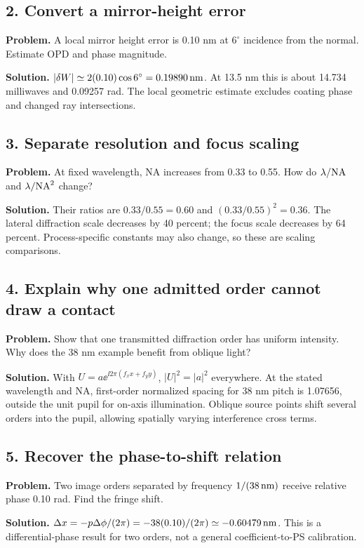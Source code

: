 \subsection*{2. Convert a mirror-height error}
\textbf{Problem.} A local mirror height error is 0.10 nm at $6^\circ$
incidence from the normal. Estimate OPD and phase magnitude.

\textbf{Solution.}
$|\delta W|\simeq2(0.10)\cos6^\circ=0.19890\,\mathrm{nm}$.
At 13.5 nm this is about 14.734 milliwaves and 0.09257 rad.
The local geometric estimate excludes coating phase and changed ray
intersections.

\subsection*{3. Separate resolution and focus scaling}
\textbf{Problem.} At fixed wavelength, NA increases from 0.33 to 0.55.
How do $\lambda/\mathrm{NA}$ and $\lambda/\mathrm{NA}^2$ change?

\textbf{Solution.}
Their ratios are $0.33/0.55=0.60$ and
$(0.33/0.55)^2=0.36$.
The lateral diffraction scale decreases by 40 percent; the focus
scale decreases by 64 percent. Process-specific constants may also
change, so these are scaling comparisons.

\subsection*{4. Explain why one admitted order cannot draw a contact}
\textbf{Problem.} Show that one transmitted diffraction order has uniform
intensity. Why does the 38 nm example benefit from oblique light?

\textbf{Solution.}
With $U=a\ee^{\ii2\pi(f_xx+f_yy)}$, $|U|^2=|a|^2$ everywhere.
At the stated wavelength and NA, first-order normalized spacing for
38 nm pitch is 1.07656, outside the unit pupil for on-axis illumination.
Oblique source points shift several orders into the pupil, allowing
spatially varying interference cross terms.

\subsection*{5. Recover the phase-to-shift relation}
\textbf{Problem.} Two image orders separated by frequency $1/(38\,\mathrm{nm})$
receive relative phase 0.10 rad. Find the fringe shift.

\textbf{Solution.}
$\Delta x=-p\Delta\phi/(2\pi)
=-38(0.10)/(2\pi)\simeq-0.60479\,\mathrm{nm}$.
This is a differential-phase result for two orders, not a general
coefficient-to-PS calibration.

